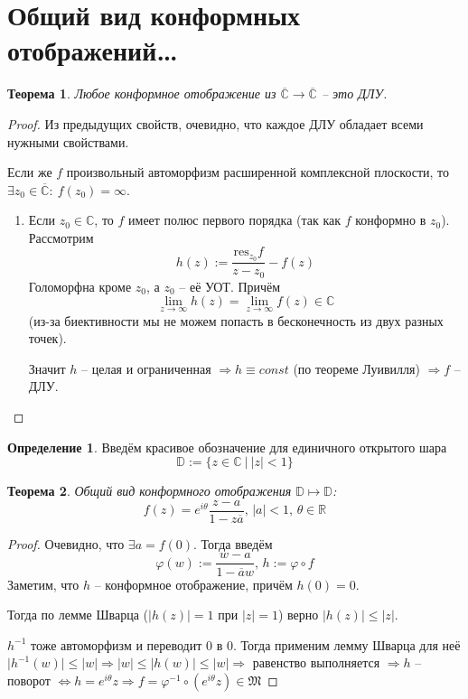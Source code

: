 \documentclass[a4paper,12pt]{article}
\renewcommand{\phi}{\ensuremath{\varphi}}
\renewcommand{\leq}{\ensuremath{\leqslant}}
\theoremstyle{plain}
\newtheorem{theorem}{Теорема}[section]
\theoremstyle{definition}
\newtheorem{definition}{Определение}[section]
\theoremstyle{remark}
\begin{document}
\section{Общий вид конформных отображений\dots}
\begin{theorem}
	Любое конформное отображение из $\overline{\mathbb{C}} \to \overline{\mathbb{C}}$ -- это ДЛУ.
\end{theorem}

\begin{proof}
	Из предыдущих свойств, очевидно, что каждое ДЛУ обладает всеми нужными свойствами.

	Если же $f$ произвольный автоморфизм расширенной комплексной плоскости, то $\exists z_0 \in \overline{\mathbb{C}} :\: f(z_0) = \infty$.

	\begin{enumerate}
		\item Если $z_0 \in \mathbb{C}$, то $f$ имеет полюс первого порядка (так как $f$ конформно в $z_0$). Рассмотрим
		      \[
			      h(z) := \frac{\text{res}_{z_0}f}{z - z_0} - f(z)
		      \]
		      Голоморфна кроме $z_0$, а $z_0$ -- её УОТ. Причём
		      \[
			      \lim_{z \to \infty}h(z) = \lim_{z \to \infty}f(z) \in \mathbb{C}
		      \]
		      (из-за биективности мы не можем попасть в бесконечность из двух разных точек).

		      Значит $h$ -- целая и ограниченная $\Rightarrow h \equiv const$ (по теореме Луивилля) $\Rightarrow f$ -- ДЛУ.
	\end{enumerate}
\end{proof}

\begin{definition}
	Введём красивое обозначение для единичного открытого шара
	\[
		\mathbb{D} := \{z \in \mathbb{C} \:\vert\: \vert z\vert < 1\}
	\]
\end{definition}

\begin{theorem}
	Общий вид конформного отображения $\mathbb{D} \mapsto \mathbb{D}$:
	\[
		f(z) = e^{i\theta}\frac{z - a}{1 - z\overline{a}},\, \vert a\vert < 1,\, \theta \in \mathbb{R}
	\]
\end{theorem}

\begin{proof}
	Очевидно, что $\exists a = f(0)$. Тогда введём
	\[
		\phi(w) := \frac{w - a}{1 - \overline{a}w},\, h := \phi\circ f
	\]
	Заметим, что $h$ -- конформное отображение, причём $h(0) = 0$.

	Тогда по лемме Шварца ($\vert h(z)\vert = 1$ при $\vert z\vert = 1$) верно $\vert h(z)\vert\leq\vert z\vert$.

	$h^{-1}$ тоже автоморфизм и переводит $0$ в $0$. Тогда применим лемму Шварца для неё $\vert h^{-1}(w)\vert \leq \vert w\vert \Rightarrow \vert w\vert \leq \vert h(w)\vert \leq \vert w\vert \Rightarrow$ равенство выполняется $\Rightarrow h$ -- поворот $\Leftrightarrow h = e^{i\theta}z \Rightarrow f = \phi^{-1}\circ(e^{i\theta}z) \in \mathfrak{M}$
\end{proof}
\end{document}
